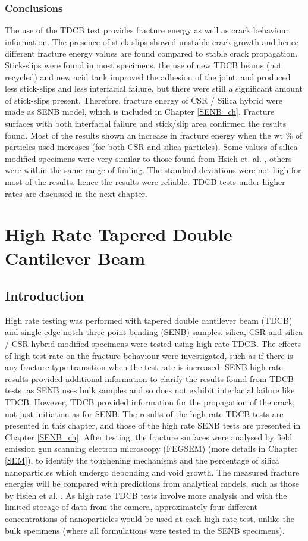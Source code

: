 \documentclass[numbers=noendperiod,chapterprefix=on]{icldt} %
\begin{document}
\subsection{Conclusions}
The use of the TDCB test provides fracture energy as well as crack behaviour information. The presence of stick-slips showed unstable crack growth and hence different fracture energy values are found compared to stable crack propagation. Stick-slips were found in most specimens, the use of new TDCB beams (not recycled) and new acid tank improved the adhesion of the joint, and produced less stick-slips and less interfacial failure, but there were still a significant amount of stick-slips present. Therefore, fracture energy of CSR / Silica hybrid were made as SENB model, which is included in Chapter \ref{SENB_ch}.
Fracture surfaces with both interfacial failure and stick/slip area confirmed the results found.
Most of the results shown an increase in fracture energy when the wt \% of particles used increases (for both CSR and silica particles). Some values of silica modified specimens were very similar to those found from Hsieh et. al. \cite{Hsieh2010}, others were within the same range of finding. The standard deviations were not high for most of the results, hence the results were reliable. 
TDCB tests under higher rates are discussed in the next chapter.

\chapter{High Rate Tapered Double Cantilever Beam}
\section{Introduction} \label{HighRate_Intro}
High rate testing was performed with tapered double cantilever beam (TDCB) and single-edge notch three-point bending (SENB) samples. silica, CSR and silica / CSR hybrid modified specimens were tested using high rate TDCB. The effects of high test rate on the fracture behaviour were investigated, such as if there is any fracture type transition when the test rate is increased. SENB high rate results provided additional information to clarify the results found from TDCB tests, as SENB uses bulk samples and so does not exhibit interfacial failure like TDCB. However, TDCB provided information for the propagation of the crack, not just initiation as for SENB. 
The results of the high rate TDCB tests are presented in this chapter, and those of the high rate SENB tests are presented in Chapter \ref{SENB_ch}. 
After testing, the fracture surfaces were analysed by field emission gun scanning electron microscopy (FEGSEM) (more details in Chapter \ref{SEM}), to identify the toughening mechanisms and the percentage of silica nanoparticles which undergo debonding and void growth. The measured fracture energies will be compared with predictions from analytical models, such as those by Hsieh et al. \cite{Hsieh2010a,Hsieh2010}.
As high rate TDCB tests involve more analysis and with the limited storage of data from the camera, approximately four different concentrations of nanoparticles would be used at each high rate test, unlike the bulk specimens (where all formulations were tested in the SENB specimens). 
\end{document}

